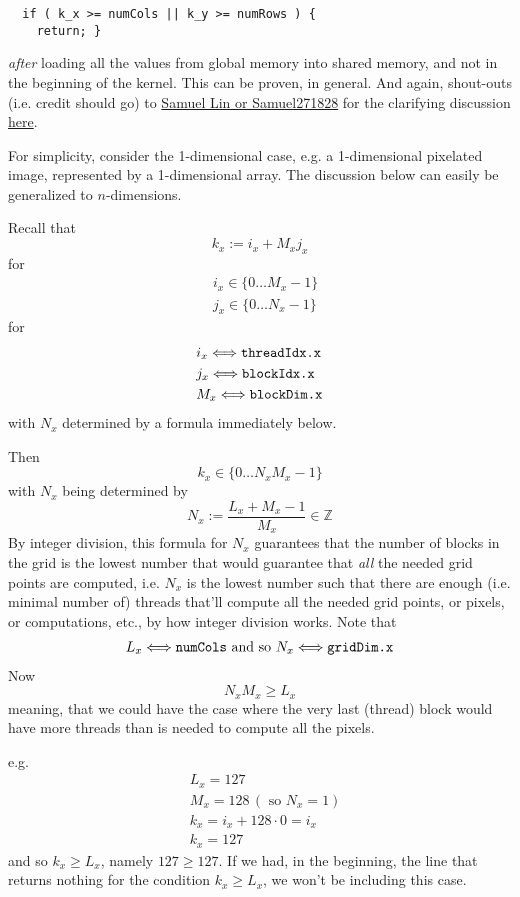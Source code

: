 \documentclass[10pt]{amsart}
\begin{document}
\begin{multicols*}{2}
\begin{lstlisting}
  if ( k_x >= numCols || k_y >= numRows ) {
    return; }
  \end{lstlisting}
\emph{after} loading all the values from global memory into shared memory, and not in the beginning of the kernel.  This can be proven, in general.  And again, shout-outs (i.e. credit should go) to \href{https://discussions.udacity.com/users/Samuel271828}{Samuel Lin or Samuel271828} for the clarifying discussion \href{https://discussions.udacity.com/t/any-one-completed-problem-set-2-using-shared-memory/158442/6}{here}.

For simplicity, consider the 1-dimensional case, e.g. a 1-dimensional pixelated image, represented by a 1-dimensional array.  The discussion below can easily be generalized to $n$-dimensions.

Recall that
\[
k_x := i_x + M_x j_x 
\]
for
\[
\begin{aligned}
  & i_x \in \lbrace 0 \dots M_x - 1 \rbrace \\ 
  & j_x \in \lbrace 0 \dots N_x - 1 \rbrace
\end{aligned}
\]
for
\[
\begin{aligned}
& i_x \Longleftrightarrow \verb|threadIdx.x| \\ 
& j_x \Longleftrightarrow \verb|blockIdx.x| \\ 
& M_x \Longleftrightarrow \verb|blockDim.x|
\end{aligned}
\]
with $N_x$ determined by a formula immediately below.  

Then
\[
k_x \in \lbrace 0 \dots N_xM_x -1 \rbrace
\]
with $N_x$ being determined by
\[
N_x := \frac{ L_x + M_x - 1 }{ M_x} \in \mathbb{Z}
\]
By integer division, this formula for $N_x$ guarantees that the number of blocks in the grid is the lowest number that would guarantee that \emph{all} the needed grid points are computed, i.e. $N_x$ is the lowest number such that there are enough (i.e. minimal number of) threads that'll compute all the needed grid points, or pixels, or computations, etc., by how integer division works.  Note that
\[
\begin{gathered}
  L_x \Longleftrightarrow \verb|numCols| \text{ and so }
  N_x \Longleftrightarrow \verb|gridDim.x|
\end{gathered}
\]
Now
\[
N_xM_x \geq L_x
\]
meaning, that we could have the case where the very last (thread) block would have more threads than is needed to compute all the pixels.  

e.g.\[
\begin{aligned}
  & L_x = 127 \\ 
  & M_x = 128 \, ( \text{ so } N_x = 1 ) \\ 
  & k_x = i_x + 128 \cdot 0 = i_x \\ 
  & k_x = 127 
  \end{aligned}
\]
and so $k_x \geq L_x$, namely $127 \geq 127$.  If we had, in the beginning, the line that returns nothing for the condition $k_x \geq L_x$, we won't be including this case.  


\end{multicols*}
\end{document}

